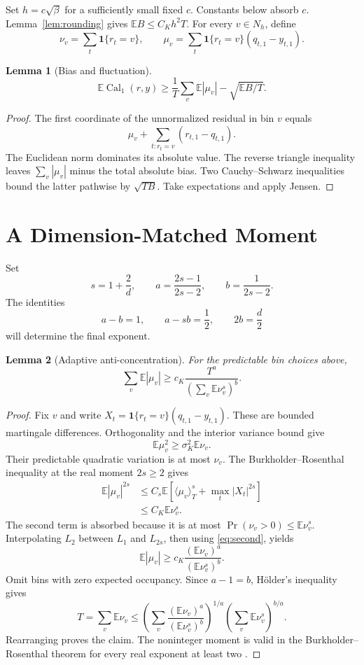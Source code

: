 \documentclass[twoside]{article}
\newtheorem{lemma}{Lemma}
\newcommand{\E}{\mathbb E}
\newcommand{\calone}{\operatorname{Cal}_1}
\newcommand{\1}{\mathbf 1}
\begin{document}
Set $h=c\sqrt\beta$ for a sufficiently small fixed $c$. Constants below absorb $c$. Lemma~\ref{lem:rounding} gives $\E B\leq C_Kh^2T$. For every $v\in N_h$, define \[ \nu_v=\sum_t\1\{r_t=v\}, \qquad \mu_v=\sum_t\1\{r_t=v\}(q_{t,1}-y_{t,1}). \]

\begin{lemma}[Bias and fluctuation]\label{lem:bias}
\[ \E\calone(r,y)\geq \frac1T\sum_v\E|\mu_v|-\sqrt{\E B/T}. \]
\end{lemma}

\begin{proof}
The first coordinate of the unnormalized residual in bin $v$ equals \[ \mu_v+\sum_{t:r_t=v}(r_{t,1}-q_{t,1}). \] The Euclidean norm dominates its absolute value. The reverse triangle inequality leaves $\sum_v|\mu_v|$ minus the total absolute bias. Two Cauchy--Schwarz inequalities bound the latter pathwise by $\sqrt{TB}$. Take expectations and apply Jensen.
\end{proof}

\section{A Dimension-Matched Moment}

Set \[ s=1+\frac2d, \qquad a=\frac{2s-1}{2s-2}, \qquad b=\frac1{2s-2}. \] The identities
\begin{equation}\label{eq:identities}
 a-b=1,
 \qquad a-sb=\frac12,
 \qquad 2b=\frac d2
\end{equation}
will determine the final exponent.

\begin{lemma}[Adaptive anti-concentration]\label{lem:anti}
For the predictable bin choices above, \[ \sum_v\E|\mu_v| \geq c_K\frac{T^a}{(\sum_v\E\nu_v^s)^b}. \]
\end{lemma}

\begin{proof}
Fix $v$ and write $X_t=\1\{r_t=v\}(q_{t,1}-y_{t,1})$. These are bounded martingale differences. Orthogonality and the interior variance bound give
\begin{equation}\label{eq:second}
 \E\mu_v^2\geq\sigma_K^2\E\nu_v.
\end{equation}
Their predictable quadratic variation is at most $\nu_v$. The Burkholder--Rosenthal inequality at the real moment $2s\geq2$ gives
\begin{align*}
 \E|\mu_v|^{2s}
 &\leq C_s\E\left[
 \langle\mu_v\rangle_T^s+\max_t|X_t|^{2s}\right]\\
 &\leq C_K\E\nu_v^s.
\end{align*}
The second term is absorbed because it is at most $\Pr(\nu_v>0)\leq\E\nu_v^s$. Interpolating $L_2$ between $L_1$ and $L_{2s}$, then using \eqref{eq:second}, yields \[ \E|\mu_v|\geq c_K\frac{(\E\nu_v)^a}{(\E\nu_v^s)^b}. \] Omit bins with zero expected occupancy. Since $a-1=b$, H\"older's inequality gives \[ T=\sum_v\E\nu_v \leq\left(\sum_v\frac{(\E\nu_v)^a}{(\E\nu_v^s)^b}\right)^{1/a} \left(\sum_v\E\nu_v^s\right)^{b/a}. \] Rearranging proves the claim. The noninteger moment is valid in the Burkholder--Rosenthal theorem for every real exponent at least two \citep{burkholder1973distribution,collina2026optimal}.
\end{proof}
\end{document}
